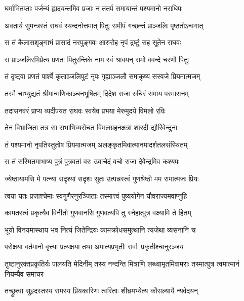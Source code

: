\twolineshloka
{घर्माभितप्ताः पर्जन्यं ह्लादयन्तमिव प्रजाः}
{न ततर्प समायान्तं पश्यमानो नराधिपः} %

\twolineshloka
{अवतार्य सुमन्त्रस्तं राघवं स्यन्दनोत्तमात्}
{पितुः समीपं गच्छन्तं प्राञ्जलिः पृष्ठतोऽन्वगात्} %

\twolineshloka
{स तं कैलासशृङ्गाभं प्रासादं नरपुङ्गवः}
{आरुरोह नृपं द्रष्टुं सह सूतेन राघवः} %

\twolineshloka
{स प्राञ्जलिरभिप्रेत्य प्रणतः पितुरन्तिके}
{नाम स्वं श्रावयन् रामो ववन्दे चरणौ पितुः} %

\twolineshloka
{तं दृष्ट्वा प्रणतं पार्श्वे कृताञ्जलिपुटं नृपः}
{गृह्याञ्जलौ समाकृष्य सस्वजे प्रियमात्मजम्} %

\twolineshloka
{तस्मै चाभ्युद्यतं श्रीमान्मणिकाञ्चनभूषितम्}
{दिदेश राजा रुचिरं रामाय परमासनम्} %

\twolineshloka
{तदासनवरं प्राप्य व्यदीपयत राघवः}
{स्वयेव प्रभया मेरुमुदये विमलो रविः} %

\twolineshloka
{तेन विभ्राजिता तत्र सा सभाभिव्यरोचत}
{विमलग्रहनक्षत्रा शारदी द्यौरिवेन्दुना} %

\twolineshloka
{तं पश्यमानो नृपतिस्तुतोष प्रियमात्मजम्}
{अलङ्कृतमिवात्मानमादर्शतलसंस्थितम्} %

\twolineshloka
{स तं सस्मितमाभाष्य पुत्रं पुत्रवतां वरः}
{उवाचेदं वचो राजा देवेन्द्रमिव कश्यपः} %

\twolineshloka
{ज्येष्ठायामसि मे पत्न्यां सदृश्यां सदृशः सुतः}
{उत्पन्नस्त्वं गुणश्रेष्ठो मम रामात्मजः प्रियः} %

\twolineshloka
{त्वया यतः प्रजाश्चेमाः स्वगुणैरनुरञ्जिताः}
{तस्मात्त्वं पुष्ययोगेन यौवराज्यमवाप्नुहि} %

\twolineshloka
{कामतस्त्वं प्रकृत्यैव विनीतो गुणवानसि}
{गुणवत्यपि तु स्नेहात्पुत्र वक्ष्यामि ते हितम्} %

\twolineshloka
{भूयो विनयमास्थाय भव नित्यं जितेन्द्रियः}
{कामक्रोधसमुत्थानि त्यजेथा व्यसनानि च} %

\twolineshloka
{परोक्षया वर्तमानो वृत्त्या प्रत्यक्षया तथा}
{अमात्यप्रभृतीः सर्वाः प्रकृतीश्चानुरञ्जय} %

\threelineshloka
{तुष्टानुरक्तप्रकृतिर्यः पालयति मेदिनीम्}
{तस्य नन्दन्ति मित्राणि लब्ध्वामृतमिवामराः}
{तस्मात्पुत्र त्वमात्मानं नियम्यैव समाचर} %

\twolineshloka
{तच्छ्रुत्वा सुहृदस्तस्य रामस्य प्रियकारिणः}
{त्वरिताः शीघ्रमभ्येत्य कौसल्यायै न्यवेदयन्} %

